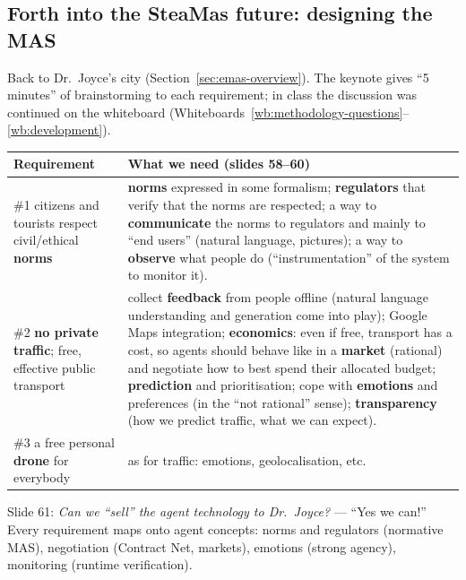 \subsection{Forth into the SteaMas future: designing the MAS}
\label{sec:steamas}

Back to Dr.\ Joyce's city (Section~\ref{sec:emas-overview}). The keynote gives ``5
minutes'' of brainstorming to each requirement; in class the discussion was continued on the
whiteboard (Whiteboards~\ref{wb:methodology-questions}--\ref{wb:development}).

\begin{center}
\small
\renewcommand{\arraystretch}{1.2}
\begin{tabularx}{\linewidth}{@{}>{\raggedright\arraybackslash}p{3.6cm} X@{}}
\toprule
\textbf{Requirement} & \textbf{What we need (slides 58--60)} \\
\midrule
\#1 citizens and tourists respect civil/ethical \textbf{norms} &
  \textbf{norms} expressed in some formalism; \textbf{regulators} that verify that the norms
  are respected; a way to \textbf{communicate} the norms to regulators and mainly to ``end
  users'' (natural language, pictures); a way to \textbf{observe} what people do
  (``instrumentation'' of the system to monitor it). \\
\#2 \textbf{no private traffic}; free, effective public transport &
  collect \textbf{feedback} from people offline (natural language understanding and
  generation come into play); Google Maps integration; \textbf{economics}: even if free,
  transport has a cost, so agents should behave like in a \textbf{market} (rational) and
  negotiate how to best spend their allocated budget; \textbf{prediction} and
  prioritisation; cope with \textbf{emotions} and preferences (in the ``not rational''
  sense); \textbf{transparency} (how we predict traffic, what we can expect). \\
\#3 a free personal \textbf{drone} for everybody &
  as for traffic: emotions, geolocalisation, etc. \\
\bottomrule
\end{tabularx}
\end{center}

\noindent Slide 61: \emph{Can we ``sell'' the agent technology to Dr.\ Joyce?} --- ``Yes we
can!'' Every requirement maps onto agent concepts: norms and regulators (normative MAS),
negotiation (Contract Net, markets), emotions (strong agency), monitoring (runtime
verification).

